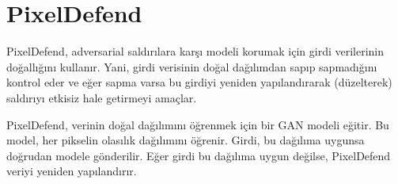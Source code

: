 \section{PixelDefend}

PixelDefend, adversarial saldırılara karşı modeli korumak için girdi verilerinin doğallığını kullanır. Yani, girdi verisinin doğal dağılımdan sapıp sapmadığını kontrol eder ve eğer sapma varsa bu girdiyi yeniden yapılandırarak (düzelterek) saldırıyı etkisiz hale getirmeyi amaçlar. 

PixelDefend, verinin doğal dağılımını öğrenmek için bir GAN modeli eğitir. Bu model, her pikselin olasılık dağılımını öğrenir. Girdi, bu dağılıma uygunsa doğrudan modele gönderilir. Eğer girdi bu dağılıma uygun değilse, PixelDefend veriyi yeniden yapılandırır.

\newpage